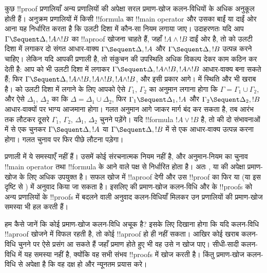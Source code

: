 \documentclass[../../../include/open-logic-section]{subfiles}
\begin{document}
कुछ !!{proof} प्रणालियाँ अन्य प्रणालियों की अपेक्षा सरल प्रमाण-खोज
कलन-विधियों के अधिक अनुकूल होती हैं। अनुक्रम प्रणालियों में किसी !!{formula}
का !!{main operator} और उसका बाईं या दाईं ओर आना यह निर्धारित करता है कि
उलटी दिशा में कौन-सा नियम लगाया जाए। उदाहरणतः यदि आप $\Gamma \Sequent
\Delta, !A \land !B$ का !!a{proof} खोजना चाहते हैं, जहाँ $!A \land !B$ दाईं
ओर है, तो \RightR{\land} को उलटी दिशा में लगाकर दो संगत आधार-वाक्य $\Gamma
\Sequent \Delta, !A$ और $\Gamma \Sequent \Delta, !B$ उत्पन्न करने चाहिए।
लेकिन यदि आपकी प्रणाली  है, तो संकुचन की उपस्थिति अधिक विकल्प देकर
काम कठिन कर देती है: आप \RightR{\Contraction} को भी उलटी दिशा में लगाकर
$\Gamma \Sequent \Delta, !A \land !B, !A \land !B$ आधार-वाक्य बना सकते हैं;
फिर $\Gamma \Sequent \Delta, !A \land !B, !A \land !B, !A \land !B$, और
इसी प्रकार आगे।  में स्थिति और भी खराब है। \RightR{\land} को उलटी
दिशा में लगाने के लिए आपको ऐसे $\Gamma_1$, $\Gamma_2$ का अनुमान लगाना होगा कि
$\Gamma = \Gamma_1 \cup \Gamma_2$, और ऐसे $\Delta_1$, $\Delta_2$ का कि
$\Delta = \Delta_1 \cup \Delta_2$, फिर $\Gamma_1 \Sequent \Delta_1, !A$
और $\Gamma_2 \Sequent \Delta_2, !B$ आधार-वाक्यों पर भाग्य आजमाना होगा। गलत
अनुमान आगे जाकर मार्ग बंद कर सकता है, तब आरंभ तक लौटकर दूसरे $\Gamma_1$,
$\Gamma_2$, $\Delta_1$, $\Delta_2$ चुनने पड़ेंगे। यदि !!{formula} $!A \lor
!B$ है, तो \RightR{\lor} की दो संभावनाओं में से एक चुनकर $\Gamma \Sequent
\Delta, !A$ या $\Gamma \Sequent \Delta, !B$ में से एक आधार-वाक्य उत्पन्न
करना होगा। गलत चुनाव पर फिर पीछे लौटना पड़ेगा।

प्रणाली  में ये समस्याएँ नहीं हैं। उसमें कोई संरचनात्मक नियम नहीं
है, और अनुमान-नियम का चुनाव !!{main operator} तथा !!{formula} के आने वाले पक्ष
से निर्धारित होता है। अतः ,  या  की अपेक्षा
प्रमाण-खोज के लिए अधिक उपयुक्त है। सफल खोज  में !!a{proof} देगी और
उस !!{proof} का फिर  या  (या इस दृष्टि से ) में
अनुवाद किया जा सकता है। इसलिए  की प्रमाण-खोज कलन-विधि और 
के !!{proof}s को अन्य प्रणालियों के !!{proof}s में बदलने वाली अनुवाद
कलन-विधियाँ मिलकर उन प्रणालियों की प्रमाण-खोज समस्या भी हल करती हैं।

हम कैसे जानें कि कोई प्रमाण-खोज कलन-विधि अचूक है? इसके लिए दिखाना होगा कि यदि
कलन-विधि !!a{proof} खोजने में विफल रहती है, तो कोई !!a{proof} हो ही नहीं सकता।
आखिर कोई खराब कलन-विधि चुनने पर ऐसे प्रसंग आ सकते हैं जहाँ प्रमाण होते हुए भी
वह उसे न खोज पाए। सीधी-सादी कलन-विधि में यह समस्या नहीं है, क्योंकि वह सभी
संभव !!{proof}s में खोज करती है। किंतु प्रमाण-खोज कलन-विधि से अपेक्षा है कि वह
दक्ष हो और न्यूनतम प्रयास करे।
\end{document}

